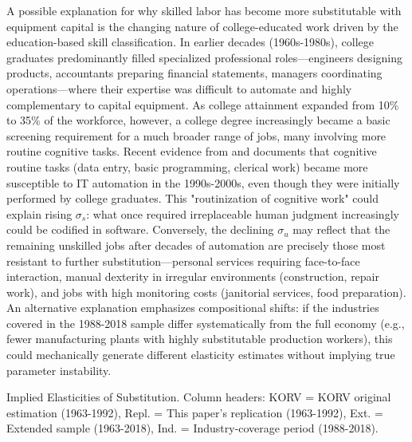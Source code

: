 \documentclass[12pt]{article}
\begin{document}
A possible explanation for why skilled labor has become more substitutable with equipment capital is the changing nature of college-educated work driven by the education-based skill classification. In earlier decades (1960s-1980s), college graduates predominantly filled specialized professional roles---engineers designing products, accountants preparing financial statements, managers coordinating operations---where their expertise was difficult to automate and highly complementary to capital equipment. As college attainment expanded from 10\% to 35\% of the workforce, however, a college degree increasingly became a basic screening requirement for a much broader range of jobs, many involving more routine cognitive tasks. Recent evidence from \citet{beaudry2016great} and \citet{deming2017growth} documents that cognitive routine tasks (data entry, basic programming, clerical work) became more susceptible to IT automation in the 1990s-2000s, even though they were initially performed by college graduates. This "routinization of cognitive work" could explain rising $\sigma_s$: what once required irreplaceable human judgment increasingly could be codified in software. Conversely, the declining $\sigma_u$ may reflect that the remaining unskilled jobs after decades of automation are precisely those most resistant to further substitution---personal services requiring face-to-face interaction, manual dexterity in irregular environments (construction, repair work), and jobs with high monitoring costs (janitorial services, food preparation). An alternative explanation emphasizes compositional shifts: if the industries covered in the 1988-2018 sample differ systematically from the full economy (e.g., fewer manufacturing plants with highly substitutable production workers), this could mechanically generate different elasticity estimates without implying true parameter instability.

\begin{table}[H]
 \begin{center}
 
 \caption{\label{tab:estimation_elasticities_korv} Implied Elasticities of Substitution. Column headers: KORV = KORV original estimation (1963-1992), Repl. = This paper's replication (1963-1992), Ext. = Extended sample (1963-2018), Ind. = Industry-coverage period (1988-2018).}
 \end{center}
 \end{table}
\end{document}

